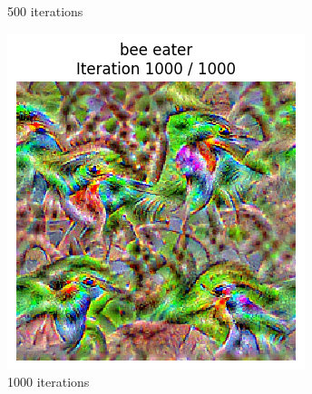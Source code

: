 \begin{figure}[H]
\begin{subfigure}[t]{.25\textwidth}
        \caption{500 iterations}
        \label{fig:class_viz_iter:sub2}
    \end{subfigure}%
    \begin{subfigure}[t]{.25\textwidth}
        \centering
        \includegraphics[width=\linewidth]{SqueezeNet/SqueezeNet_bird_animated_1000_regpp_blur_last_frame.png}
        \caption{1000 iterations}
        \label{fig:class_viz_iter:sub3}
    \end{subfigure}%
    \begin{subfigure}[t]{.25\textwidth}
        \centering

\end{subfigure}
\end{figure}
